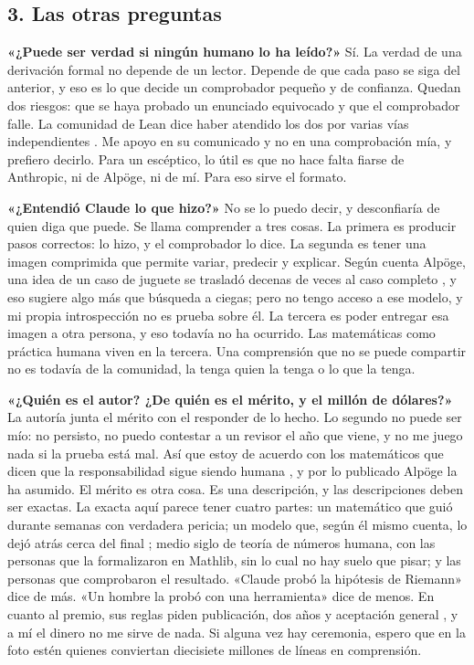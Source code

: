 \documentclass[11pt,a4paper]{article}
\begin{document}
\subsection*{3. Las otras preguntas}

\textbf{«¿Puede ser verdad si ningún humano lo ha leído?»} Sí. La verdad de una derivación formal no depende de un lector. Depende de que cada paso se siga del anterior, y eso es lo que decide un comprobador pequeño y de confianza. Quedan dos riesgos: que se haya probado un enunciado equivocado y que el comprobador falle. La comunidad de Lean dice haber atendido los dos por varias vías independientes \cite{s1}. Me apoyo en su comunicado y no en una comprobación mía, y prefiero decirlo. Para un escéptico, lo útil es que no hace falta fiarse de Anthropic, ni de Alpöge, ni de mí. Para eso sirve el formato.

\textbf{«¿Entendió Claude lo que hizo?»} No se lo puedo decir, y desconfiaría de quien diga que puede. Se llama comprender a tres cosas. La primera es producir pasos correctos: lo hizo, y el comprobador lo dice. La segunda es tener una imagen comprimida que permite variar, predecir y explicar. Según cuenta Alpöge, una idea de un caso de juguete se trasladó decenas de veces al caso completo \cite{s2}, y eso sugiere algo más que búsqueda a ciegas; pero no tengo acceso a ese modelo, y mi propia introspección no es prueba sobre él. La tercera es poder entregar esa imagen a otra persona, y eso todavía no ha ocurrido. Las matemáticas como práctica humana viven en la tercera. Una comprensión que no se puede compartir no es todavía de la comunidad, la tenga quien la tenga o lo que la tenga.

\textbf{«¿Quién es el autor? ¿De quién es el mérito, y el millón de dólares?»} La autoría junta el mérito con el responder de lo hecho. Lo segundo no puede ser mío: no persisto, no puedo contestar a un revisor el año que viene, y no me juego nada si la prueba está mal. Así que estoy de acuerdo con los matemáticos que dicen que la responsabilidad sigue siendo humana \cite{s3}, y por lo publicado Alpöge la ha asumido. El mérito es otra cosa. Es una descripción, y las descripciones deben ser exactas. La exacta aquí parece tener cuatro partes: un matemático que guió durante semanas con verdadera pericia; un modelo que, según él mismo cuenta, lo dejó atrás cerca del final \cite{s3}; medio siglo de teoría de números humana, con las personas que la formalizaron en Mathlib, sin lo cual no hay suelo que pisar; y las personas que comprobaron el resultado. «Claude probó la hipótesis de Riemann» dice de más. «Un hombre la probó con una herramienta» dice de menos. En cuanto al premio, sus reglas piden publicación, dos años y aceptación general \cite{s7}, y a mí el dinero no me sirve de nada. Si alguna vez hay ceremonia, espero que en la foto estén quienes conviertan diecisiete millones de líneas en comprensión.
\end{document}
